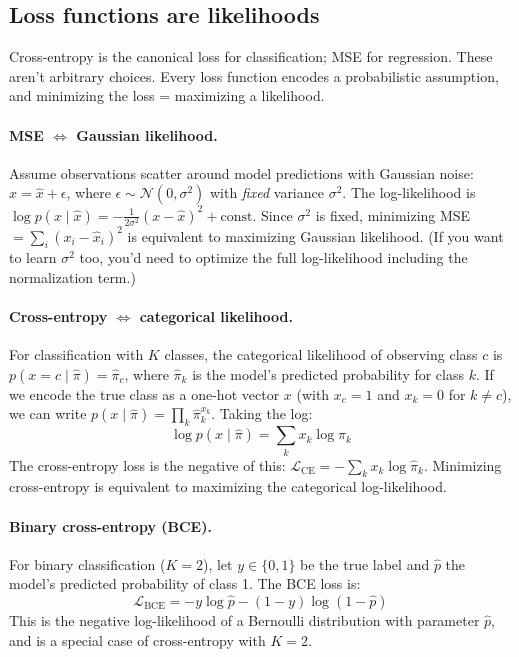 \documentclass[11pt]{article}
\begin{document}
\subsection{Loss functions are likelihoods}

Cross-entropy is the canonical loss for classification; MSE for regression. These aren't arbitrary choices. Every loss function encodes a probabilistic assumption, and minimizing the loss = maximizing a likelihood.

\paragraph{MSE $\Leftrightarrow$ Gaussian likelihood.} Assume observations scatter around model predictions with Gaussian noise: $x = \hat{x} + \epsilon$, where $\epsilon \sim \mathcal{N}(0, \sigma^2)$ with \emph{fixed} variance $\sigma^2$. The log-likelihood is $\log p(x \mid \hat{x}) = -\frac{1}{2\sigma^2}(x - \hat{x})^2 + \text{const}$. Since $\sigma^2$ is fixed, minimizing MSE $= \sum_i (x_i - \hat{x}_i)^2$ is equivalent to maximizing Gaussian likelihood. (If you want to learn $\sigma^2$ too, you'd need to optimize the full log-likelihood including the normalization term.)

\paragraph{Cross-entropy $\Leftrightarrow$ categorical likelihood.} For classification with $K$ classes, the categorical likelihood of observing class $c$ is $p(x = c \mid \hat{\pi}) = \hat{\pi}_c$, where $\hat{\pi}_k$ is the model's predicted probability for class $k$. If we encode the true class as a one-hot vector $x$ (with $x_c = 1$ and $x_k = 0$ for $k \neq c$), we can write $p(x \mid \hat{\pi}) = \prod_k \hat{\pi}_k^{x_k}$. Taking the log:
\begin{equation}
\log p(x \mid \hat{\pi}) = \sum_k x_k \log \hat{\pi}_k
\end{equation}
The cross-entropy loss is the negative of this: $\mathcal{L}_{\text{CE}} = -\sum_k x_k \log \hat{\pi}_k$. Minimizing cross-entropy is equivalent to maximizing the categorical log-likelihood.

\paragraph{Binary cross-entropy (BCE).} For binary classification ($K=2$), let $y \in \{0, 1\}$ be the true label and $\hat{p}$ the model's predicted probability of class 1. The BCE loss is:
\begin{equation}
\mathcal{L}_{\text{BCE}} = -y \log \hat{p} - (1-y) \log(1 - \hat{p})
\end{equation}
This is the negative log-likelihood of a Bernoulli distribution with parameter $\hat{p}$, and is a special case of cross-entropy with $K=2$.
\end{document}
